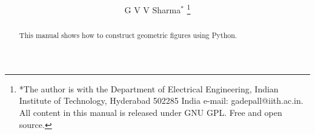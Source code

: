 \documentclass[journal,12pt,twocolumn]{IEEEtran}
\renewcommand\thesection{\arabic{section}}
\begin{document}
\let\StandardTheFigure\thefigure
\renewcommand{\thefigure}{\thesection}



\makeatletter
{}
\makeatother

\let\StandardTheFigure\thefigure
\let\StandardTheTable\thetable
\let\vec\mathbf





\def\putbox#1#2#3{\makebox[0in][l]{\makebox[#1][l]{}\raisebox{\baselineskip}[0in][0in]{\raisebox{#2}[0in][0in]{#3}}}}
     \def\rightbox#1{\makebox[0in][r]{#1}}
     \def\centbox#1{\makebox[0in]{#1}}
     \def\topbox#1{\raisebox{-\baselineskip}[0in][0in]{#1}}
     \def\midbox#1{\raisebox{-0.5\baselineskip}[0in][0in]{#1}}

\vspace{3cm}

\title{ 
}

\author{ G V V Sharma$^{*}$%
	\thanks{*The author is with the Department
		of Electrical Engineering, Indian Institute of Technology, Hyderabad
		502285 India e-mail:  gadepall@iith.ac.in. All content in this manual is released under GNU GPL.  Free and open source.}
	
}	

\maketitle

\tableofcontents

\bigskip

\renewcommand{\thefigure}{\theenumi}
\renewcommand{\thetable}{\theenumi}

\begin{abstract}
This manual shows how to construct geometric figures using Python. 
\end{abstract}
\end{document}
